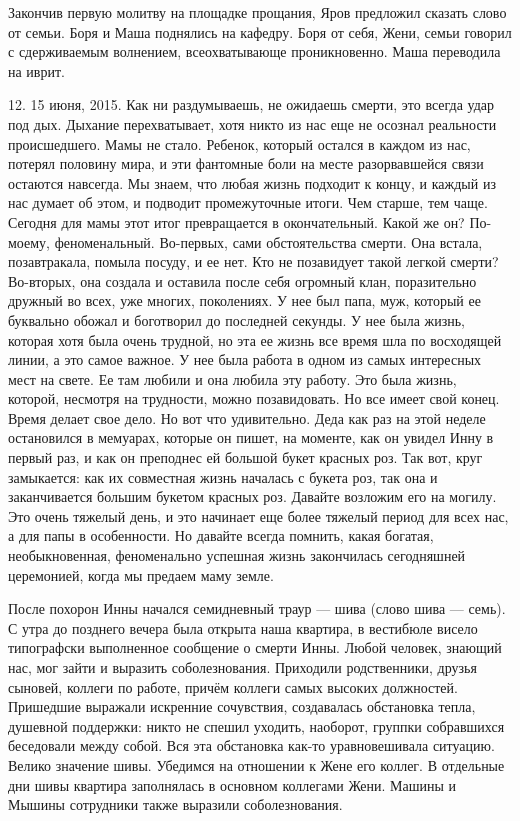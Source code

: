 Закончив первую молитву на площадке прощания, Яров предложил сказать слово от семьи. Боря и Маша поднялись на кафедру. Боря от себя, Жени, семьи говорил с сдерживаемым волнением, всеохватывающе проникновенно. Маша переводила на иврит.

12. 15 июня, 2015. Как ни раздумываешь, не ожидаешь смерти, это всегда удар под дых. Дыхание перехватывает, хотя никто из нас еще не осознал реальности происшедшего. Мамы не стало. Ребенок, который остался в каждом из нас, потерял половину мира, и эти фантомные боли на месте разорвавшейся связи остаются навсегда. Мы знаем, что любая жизнь подходит к концу, и каждый из нас думает об этом, и подводит промежуточные итоги. Чем старше, тем чаще. Сегодня для мамы этот итог превращается в окончательный. Какой же он? По-моему, феноменальный. Во-первых, сами обстоятельства смерти. Она встала, позавтракала, помыла посуду, и ее нет. Кто не позавидует такой легкой смерти? Во-вторых, она создала и оставила после себя огромный клан, поразительно дружный во всех, уже многих, поколениях. У нее был папа, муж, который ее буквально обожал и боготворил до последней секунды. У нее была жизнь, которая хотя была очень трудной, но эта ее жизнь все время шла по восходящей линии, а это самое важное. У нее была работа в одном из самых интересных мест на свете. Ее там любили и она любила эту работу. Это была жизнь, которой, несмотря на трудности, можно позавидовать. Но все имеет свой конец. Время делает свое дело. Но вот что удивительно. Деда как раз на этой неделе остановился в мемуарах, которые он пишет, на моменте, как он увидел Инну в первый раз, и как он преподнес ей большой букет красных роз. Так вот, круг замыкается: как их совместная жизнь началась с букета роз, так она и заканчивается большим букетом красных роз. Давайте возложим его на могилу. Это очень тяжелый день, и это начинает еще более тяжелый период для всех нас, а для папы в особенности. Но давайте всегда помнить, какая богатая, необыкновенная, феноменально успешная жизнь закончилась сегодняшней церемонией, когда мы предаем маму земле.

После похорон Инны начался семидневный траур — шива (слово шива — семь). С утра до позднего вечера была открыта наша квартира, в вестибюле висело типографски выполненное сообщение о смерти Инны. Любой человек, знающий нас, мог зайти и выразить соболезнования. Приходили родственники, друзья сыновей, коллеги по работе, причём коллеги самых высоких должностей. Пришедшие выражали искренние сочувствия, создавалась обстановка тепла, душевной поддержки: никто не спешил уходить, наоборот, группки собравшихся беседовали между собой. Вся эта обстановка как-то уравновешивала ситуацию. Велико значение шивы. Убедимся на отношении к Жене его коллег. В отдельные дни шивы квартира заполнялась в основном коллегами Жени. Машины и Мышины сотрудники также выразили соболезнования.